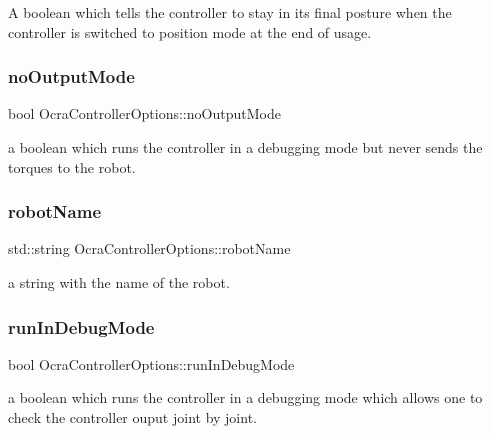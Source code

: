 A boolean which tells the controller to stay in its final posture when the controller is switched to position mode at the end of usage. \hypertarget{classOcraControllerOptions_af05db2783f36f469fa535fd4ba5c12b1}{}\label{classOcraControllerOptions_af05db2783f36f469fa535fd4ba5c12b1} 
\subsubsection{\texorpdfstring{no\+Output\+Mode}{noOutputMode}}
{\footnotesize\ttfamily bool Ocra\+Controller\+Options\+::no\+Output\+Mode}

a boolean which runs the controller in a debugging mode but never sends the torques to the robot. \hypertarget{classOcraControllerOptions_a897948011f23b08ba20e1707033458d4}{}\label{classOcraControllerOptions_a897948011f23b08ba20e1707033458d4} 
\subsubsection{\texorpdfstring{robot\+Name}{robotName}}
{\footnotesize\ttfamily std\+::string Ocra\+Controller\+Options\+::robot\+Name}

a string with the name of the robot. \hypertarget{classOcraControllerOptions_a26dce90c0e6cf7ba608020d01cd08f3c}{}\label{classOcraControllerOptions_a26dce90c0e6cf7ba608020d01cd08f3c} 
\subsubsection{\texorpdfstring{run\+In\+Debug\+Mode}{runInDebugMode}}
{\footnotesize\ttfamily bool Ocra\+Controller\+Options\+::run\+In\+Debug\+Mode}

a boolean which runs the controller in a debugging mode which allows one to check the controller ouput joint by joint. \hypertarget{classOcraControllerOptions_a22380b083fbf0b202993d0415d1d4c83}{}\label{classOcraControllerOptions_a22380b083fbf0b202993d0415d1d4c83} 
